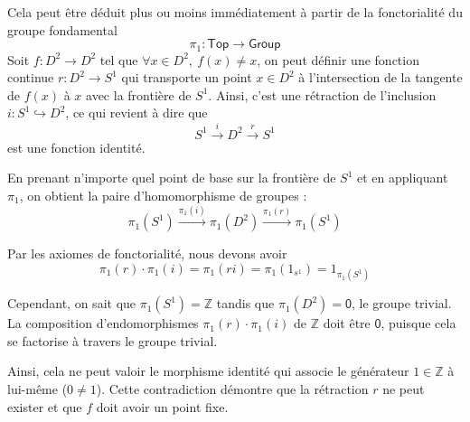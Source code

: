 \documentclass[justified]{tufte-handout}
\newtheorem{prop}{Proposition}
\def\msf{\mathsf}
\def\mbbf{\mathbb}
\begin{document}
Cela peut être déduit plus ou moins immédiatement à partir de la fonctorialité
du groupe fondamental \[ \pi_1 : \msf{Top} \rightarrow \msf{Group} \]
Soit $f : D^2 \rightarrow D^2$ tel que $\forall x \in D^2,\ f(x) \neq x$, on
peut définir une fonction continue $r : D^2 \rightarrow S^1$ qui transporte un
point $x \in D^2$ à l'intersection de la tangente de $f(x)$ à $x$ avec la
frontière de $S^1$. Ainsi, c'est une rétraction de l'inclusion $i : S^1
	\hookrightarrow D^2$, ce qui revient à dire que \[ S^1 \xrightarrow{i} D^2 \xrightarrow{r} S^1 \] est une fonction identité. \vspace{5pt}


En prenant n'importe quel point de base sur la frontière de $S^1$ et en
appliquant $\pi_1$, on obtient la paire d'homomorphisme de groupes : \[ \pi_1(S^1) \xrightarrow{\pi_1(i)} \pi_1(D^2) \xrightarrow{\pi_1(r)} \pi_1(S^1) \]

Par les axiomes de fonctorialité, nous devons avoir \[ \pi_1(r) \cdot \pi_1(i) = \pi_1(ri) = \pi_1(1_{s^1}) = 1_{\pi_1(S^1)} \]

Cependant, on sait que $\pi_1(S^1) = \mbbf{Z}$ tandis que $\pi_1(D^2) =
	\msf{0}$, le groupe trivial. La composition d'endomorphismes $\pi_1(r) \cdot
	\pi_1(i)$ de $\mbbf{Z}$ doit être $\msf{0}$, puisque cela se factorise à
travers le groupe trivial.

Ainsi, cela ne peut valoir le morphisme identité qui associe le générateur $1
	\in \mbbf{Z}$ à lui-même ($0 \neq 1$). Cette contradiction démontre que la
rétraction $r$ ne peut exister et que $f$ doit avoir un point fixe.
\end{document}
